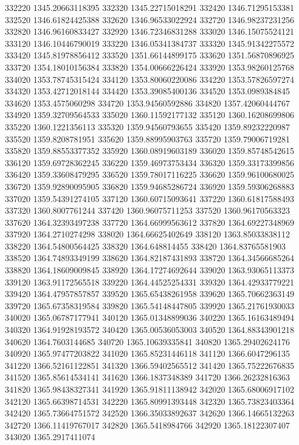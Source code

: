 {332220 1345.20663118395
332320 1345.22715018291
332420 1346.71295153381
332520 1346.61824425388
332620 1346.96533022924
332720 1346.98237231256
332820 1346.96160833427
332920 1346.72346831288
333020 1346.15075524121
333120 1346.10446790019
333220 1346.05341384737
333320 1345.91342275572
333420 1345.81978856412
333520 1351.66144899175
333620 1351.56870896925
333720 1354.18010156384
333820 1354.00666226424
333920 1353.98260125768
334020 1353.78745315424
334120 1353.80060220086
334220 1353.57826597274
334320 1353.42712018144
334420 1353.39085400136
334520 1353.0989384845
334620 1353.4575060298
334720 1353.94560592886
334820 1357.42060444767
334920 1359.32709564533
335020 1360.11592177132
335120 1360.16208699806
335220 1360.1221356113
335320 1359.94560793655
335420 1359.89232220987
335520 1359.8208781951
335620 1359.88995903763
335720 1359.79006719281
335820 1359.88553377352
335920 1360.08919603189
336020 1359.85748542615
336120 1359.69728362245
336220 1359.46973753434
336320 1359.33173399856
336420 1359.33608479295
336520 1359.78017116225
336620 1359.96100680025
336720 1359.92890095905
336820 1359.94685286724
336920 1359.59306268883
337020 1359.54391274105
337120 1360.60715093641
337220 1360.61817588493
337320 1360.8007761244
337420 1360.96075711253
337520 1360.96170563323
337620 1364.32393497238
337720 1364.66999563612
337820 1364.69227348969
337920 1364.2710274298
338020 1364.66625402649
338120 1363.85033838112
338220 1364.54800564425
338320 1364.648814455
338420 1364.83765581903
338520 1364.74893349199
338620 1364.82187431893
338720 1364.34566685264
338820 1364.18609009845
338920 1364.17274692644
339020 1363.93065113373
339120 1363.91172565518
339220 1364.44525254331
339320 1364.42933779221
339420 1364.47957857857
339520 1365.65438261958
339620 1365.70662363149
339720 1365.67358319584
339820 1365.54148447805
339920 1365.21761930033
340020 1365.06787177941
340120 1365.01348899036
340220 1365.16163489494
340320 1364.91928193572
340420 1365.00536053003
340520 1364.88343901218
340620 1364.7603144685
340720 1365.10639335841
340820 1365.29402624176
340920 1365.97477203822
341020 1365.85231446118
341120 1366.6047296135
341220 1366.52161122851
341320 1366.59402565512
341420 1365.75222676835
341520 1365.85614534141
341620 1366.1837348389
341720 1366.26232816363
341820 1365.98438327341
341920 1365.91811138942
342020 1365.68006917102
342120 1365.66398714531
342220 1365.80991393448
342320 1365.73823403364
342420 1365.73664751572
342520 1366.35033892637
342620 1366.14665132263
342720 1366.11419767017
342820 1365.5418984766
342920 1365.18122307407
343020 1365.2917411074
}
